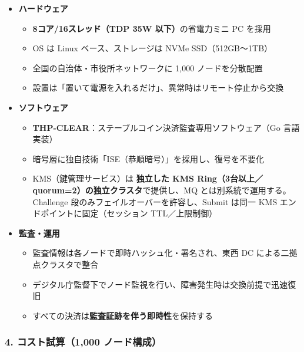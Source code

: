 \documentclass[
]{article}
\providecommand{\tightlist}{%
  \setlength{\itemsep}{0pt}\setlength{\parskip}{0pt}}
\begin{document}
\begin{itemize}
\tightlist
\item
  \textbf{ハードウェア}

  \begin{itemize}
  \tightlist
  \item
    \textbf{8コア/16スレッド（TDP 35W 以下）}の省電力ミニ PC を採用\\
  \item
    OS は Linux ベース、ストレージは NVMe SSD（512GB～1TB）\\
  \item
    全国の自治体・市役所ネットワークに 1,000 ノードを分散配置\\
  \item
    設置は「置いて電源を入れるだけ」、異常時はリモート停止から交換
  \end{itemize}
\item
  \textbf{ソフトウェア}

  \begin{itemize}
  \tightlist
  \item
    \textbf{THP-CLEAR}：ステーブルコイン決済監査専用ソフトウェア（Go
    言語実装）\\
  \item
    暗号層に独自技術「ISE（恭順暗号）」を採用し、復号を不要化\\
  \item
    KMS（鍵管理サービス）は \textbf{独立した KMS
    Ring（3台以上／quorum=2）の独立クラスタ}で提供し、MQ
    とは別系統で運用する。Challenge
    段のみフェイルオーバーを許容し、Submit は同一 KMS
    エンドポイントに固定（セッション TTL／上限制御）
  \end{itemize}
\item
  \textbf{監査・運用}

  \begin{itemize}
  \tightlist
  \item
    監査情報は各ノードで即時ハッシュ化・署名され、東西 DC
    による二拠点クラスタで整合\\
  \item
    デジタル庁監督下でノード監視を行い、障害発生時は交換前提で迅速復旧\\
  \item
    すべての決済は\textbf{監査証跡を伴う即時性}を保持する
  \end{itemize}
\end{itemize}

\subsubsection{4. コスト試算（1,000
ノード構成）}\label{ux30b3ux30b9ux30c8ux8a66ux7b971000-ux30ceux30fcux30c9ux69cbux6210}
\end{document}
